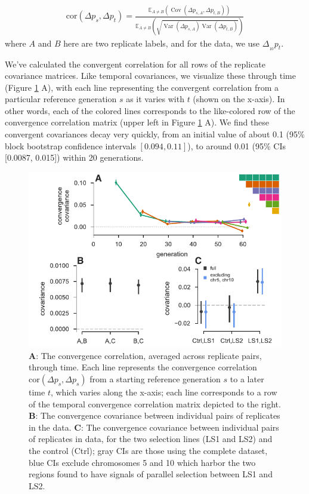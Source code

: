 \documentclass[11pt]{article}
\newcommand{\E}{\mathbb{E}}
\DeclareMathOperator{\var}{Var}
\DeclareMathOperator{\cov}{Cov}
\begin{document}
\begin{align}
  \label{eq:conv-corr}
  \mathrm{cor}(\Delta p_s, \Delta p_t) = \frac{\E_{A\ne B} \left( \cov(\Delta p_{s,A}, \Delta p_{t,B}) \right)}{\E_{A\ne B} \left( \sqrt{\var(\Delta p_{s,A}) \var(\Delta p_{t,B})} \right)}
\end{align}
%
where $A$ and $B$ here are two replicate labels, and for the
\textcite{Barghi2019-qy} data, we use $\Delta_{_{10}} p_t$.

We've calculated the convergent correlation for all rows of the replicate
covariance matrices. Like temporal covariances, we visualize these through time
(Figure \ref{fig:figure-2} A), with each line representing the convergent
correlation from a particular reference generation $s$ as it varies with $t$
(shown on the x-axis). In other words, each of the colored lines corresponds to
the like-colored row of the convergence correlation matrix (upper left in
Figure \ref{fig:figure-2} A). We find these convergent covariances decay very
quickly, from an initial value of about 0.1 (95\% block bootstrap confidence
intervals $[0.094, 0.11]$), to around 0.01 (95\% CIs [0.0087, 0.015]) within 20
generations.

\begin{figure}[!htb]
  \centering
  \includegraphics[width=\textwidth]{figures/figure-2.pdf}

  \caption{{\bf A}: The convergence correlation, averaged across replicate
    pairs, through time. Each line represents the convergence correlation
    $\mathrm{cor}(\Delta p_{s}, \Delta p_{s})$ from a starting reference
    generation $s$ to a later time $t$, which varies along the x-axis; each
    line corresponds to a row of the temporal convergence correlation matrix
    depicted to the right.  {\bf B}: The convergence covariance between
    individual pairs of replicates in the \textcite{Kelly2019-dc} data. {\bf
    C}:  The convergence covariance between individual pairs of replicates in
    \parencite{Castro2019-uk} data, for the two selection lines  (LS1 and LS2)
    and the control (Ctrl); gray CIs are those using the complete dataset, blue
    CIs exclude chromosomes 5 and 10 which harbor the two regions
    \textcite{Castro2019-uk} found to have signals of parallel selection between
    LS1 and LS2.}

  \label{fig:figure-2}
\end{figure}
\end{document}
